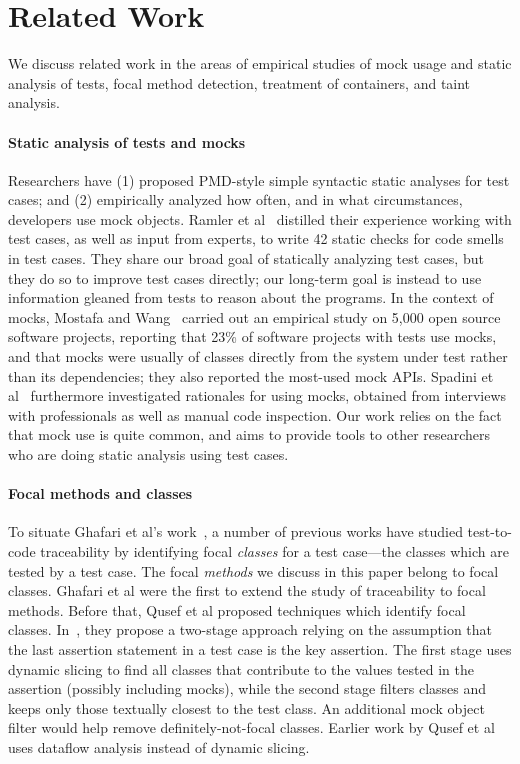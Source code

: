 \section{Related Work}
\label{sec:related}

We discuss related work in the areas of empirical studies of mock usage and static analysis of tests, focal method detection,
treatment of containers, and taint analysis.

\paragraph{Static analysis of tests and mocks}
Researchers have (1) proposed PMD-style simple syntactic static analyses for test cases; and (2) empirically analyzed how often, and in what circumstances, developers use mock objects.
Ramler et al~\cite{ramler16:_autom_static_analy_unit_test_code} distilled their experience working with test cases, as well as input from experts, to write 42 static checks for code smells in test cases.
They share our broad goal of statically analyzing test cases, but they do so to improve test cases directly; our long-term goal is instead to use information gleaned from tests to reason about the
programs. In the context of mocks, Mostafa and Wang~\cite{mostafa14:_empir_study_usage_mockin_framew_softw_testin} carried out an empirical study on 5,000 open source software projects, reporting that
23\% of software projects with tests use mocks, and that mocks were usually of classes directly from the system under test rather than its dependencies; they also reported the most-used mock APIs.
Spadini et al~\cite{spadini19:_mock_java} furthermore investigated rationales for using mocks, obtained from interviews with professionals as well as manual code inspection. Our work relies on the
fact that mock use is quite common, and aims to provide tools to other researchers who are doing static analysis using test cases.

\paragraph{Focal methods and classes} To situate Ghafari et al's work~\cite{ghafari15:_autom}, a number of previous works have studied test-to-code traceability by identifying focal \emph{classes} for a test case---the classes which are tested by a test case. The focal \emph{methods} we discuss in this paper belong to focal classes. Ghafari et al were the first to extend the study of traceability to focal methods. Before that, Qusef et al proposed techniques which identify focal classes. In~\cite{DBLP:conf/icsm/QusefBOLB11}, they propose a two-stage approach relying on the assumption that the last assertion statement in a test case is the key assertion. The first stage uses dynamic slicing to find all classes that contribute to the values tested in the assertion (possibly including mocks), while the second stage filters classes and keeps only those textually closest to the test class. An additional mock object filter would help remove definitely-not-focal classes. Earlier work by Qusef et al~\cite{DBLP:conf/icsm/QusefOL10} uses dataflow analysis instead of dynamic slicing.

